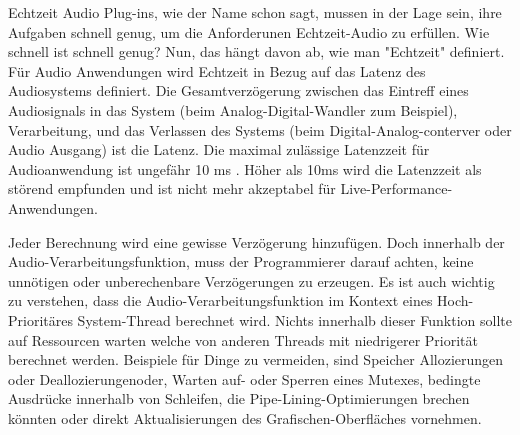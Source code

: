 Echtzeit Audio Plug-ins, wie der Name schon sagt, mussen in der Lage sein, ihre Aufgaben schnell genug, um die Anforderunen Echtzeit-Audio zu erfüllen. Wie schnell ist schnell genug? Nun, das hängt davon ab, wie man "Echtzeit" definiert. Für Audio Anwendungen wird Echtzeit in Bezug auf das Latenz des Audiosystems definiert. Die Gesamtverzögerung zwischen das Eintreff eines Audiosignals in das System (beim Analog-Digital-Wandler zum Beispiel), Verarbeitung, und das Verlassen des Systems (beim Digital-Analog-conterver oder Audio Ausgang) ist die Latenz. Die maximal zulässige Latenzzeit für Audioanwendung ist ungefähr 10 ms \cite{AES67-2013}. Höher als 10ms wird die Latenzzeit als störend empfunden und ist nicht mehr akzeptabel für Live-Performance-Anwendungen.

Jeder Berechnung wird eine gewisse Verzögerung hinzufügen. Doch innerhalb der Audio-Verarbeitungsfunktion, muss der Programmierer darauf achten, keine unnötigen oder unberechenbare Verzögerungen zu erzeugen. Es ist auch wichtig zu verstehen, dass die Audio-Verarbeitungsfunktion im Kontext eines Hoch-Prioritäres System-Thread berechnet wird. Nichts innerhalb dieser Funktion sollte auf Ressourcen warten welche von anderen Threads mit niedrigerer Priorität berechnet werden. Beispiele für Dinge zu vermeiden, sind Speicher Allozierungen oder Deallozierungenoder, Warten auf- oder Sperren eines Mutexes, bedingte Ausdrücke innerhalb von Schleifen, die Pipe-Lining-Optimierungen brechen könnten\cite{realtime-architectures} oder direkt  Aktualisierungen des Grafischen-Oberfläches vornehmen.